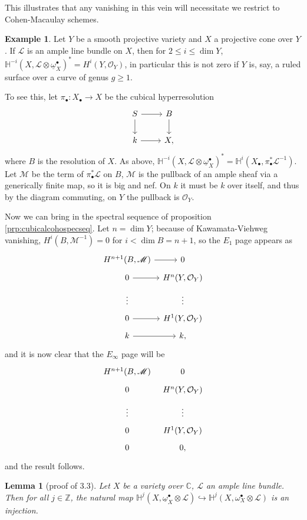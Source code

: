 \documentclass{report}
\newtheorem{lemma}[theorem]{Lemma}
\theoremstyle{definition}
\newtheorem{example}[theorem]{Example}
\newcommand{\CC}{\mathbb{C}}
\newcommand{\HH}{\mathbb{H}}
\newcommand{\LL}{\mathcal{L}}
\newcommand{\MM}{\mathscr{M}}
\newcommand{\OO}{\mathcal{O}}
\newcommand{\ZZ}{\mathbb{Z}}
\newcommand{\db}{\underline{\omega}^\bullet}
\begin{document}
This illustrates that any vanishing in this vein will necessitate we restrict to Cohen-Macaulay schemes.

\begin{example}
	Let $Y$ be a smooth projective variety and $X$ a projective cone over $Y$.
	If $\LL$ is an ample line bundle on $X$, then for $2 \leq i \leq \dim Y$, $\HH^{-i}(X, \LL \otimes \db_X)^* = H^i(Y, \OO_Y)$, in particular this is not zero if $Y$ is, say, a ruled surface over a curve of genus $g \geq 1$.
	
	To see this, let $\pi_\bullet : X_\bullet \rightarrow X$ be the cubical hyperresolution
	\[\begin{tikzcd}
		S \arrow{r} \arrow{d} & B \arrow{d} \\
		k \arrow{r} & X,
	\end{tikzcd}\]
	where $B$ is the resolution of $X$.
	As above, $\HH^{-i}(X, \LL \otimes \db_X)^* = \HH^i(X_\bullet, \pi_\bullet^* \LL^{-1})$.
	Let $\MM$ be the term of $\pi_\bullet^* \LL$ on $B$, $\MM$ is the pullback of an ample sheaf via a generically finite map, so it is big and nef.
	On $k$ it must be $k$ over itself, and thus by the diagram commuting, on $Y$ the pullback is $\OO_Y$.
	
	Now we can bring in the spectral sequence of proposition \ref{prp:cubicalcohospecseq}.
	Let $n = \dim Y$; because of Kawamata-Viehweg vanishing, $H^i(B, \MM^{-1}) = 0$ for $i < \dim B  = n + 1$, so the $E_1$ page appears as
	\[\begin{tikzcd}[row sep = tiny, column sep = tiny]
		H^{n+1}(B, \MM) \arrow{r} & 0 \\
		0 \arrow{r} & H^n(Y, \OO_Y) \\
		\vdots & \vdots \\
		0 \arrow{r} & H^1(Y, \OO_Y) \\
		k \arrow{r} & k,
	\end{tikzcd}\]
	and it is now clear that the $E_\infty$ page will be
	\[\begin{tikzcd}[row sep = tiny, column sep = tiny]
	H^{n+1}(B, \MM) & 0 \\
	0  & H^n(Y, \OO_Y) \\
	\vdots & \vdots \\
	0 & H^1(Y, \OO_Y) \\
	0 & 0,
	\end{tikzcd}\]
	and the result follows.
\end{example}

\begin{lemma}[proof of \cite{Kovacs2011a} 3.3]
	Let $X$ be a variety over $\CC$, $\LL$ an ample line bundle.
	Then for all $j \in \ZZ$, the natural map
	$\HH^j(X, \db_X \otimes \LL) \hookrightarrow \HH^j(X,\omega_X^\bullet \otimes \LL)$ is an injection.
\end{lemma}
\end{document}
